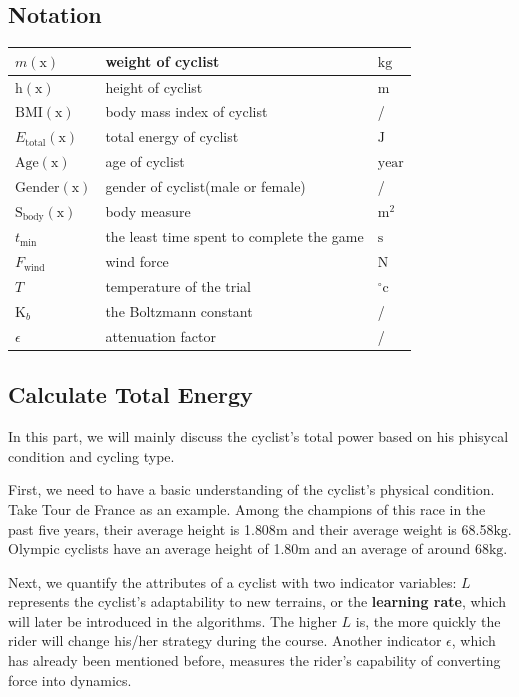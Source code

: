 \documentclass[12pt]{article}
\theoremstyle{definition}
\theoremstyle{remark}
\numberwithin{equation}{section}
\begin{document}
	\subsection{Notation}
	\begin{tabular}{|l|l|l|}
		\hline
		$m(\mathrm{x})$&weight of cyclist&$\mathrm{kg}$\\
		\hline
		$\mathrm{h}(\mathrm{x})$&height of cyclist&$\mathrm{m}$\\
		\hline
		$\mathrm{BMI}(\mathrm{x})$&body mass index of cyclist&/\\
		\hline
		$E_\mathrm{total} (\mathrm{x})$&total energy of cyclist&$\mathrm{J}$\\
		\hline
		$\mathrm{Age}(\mathrm{x})$&age of cyclist&$\mathrm{year}$\\
		\hline
		$\mathrm{Gender}(\mathrm{x})$&gender of cyclist(male or female)&/\\
		\hline
		$\mathrm{S}_\mathrm{body}(\mathrm{x})$&body measure&$\mathrm{m}^2$\\
		\hline
		$t_\mathrm{min}$&the least time spent to complete the game&$\mathrm{s}$\\
		\hline
		$F_\mathrm{wind}$&wind force&$\mathrm{N}$\\
		\hline
		$T$&temperature of the trial&$^{\circ}\mathrm{c}$\\
		\hline
		$\mathrm{K}_b$&the Boltzmann constant&/\\
		\hline
		$\epsilon$&attenuation factor&/\\
		\hline
	\end{tabular}
	\subsection{Calculate Total Energy}
	In this part, we will mainly discuss the cyclist's total power based on his phisycal condition and cycling type. 

	First, we need to have a basic understanding of the cyclist's physical condition. Take Tour de France as an example\cite{france}. Among the champions of this race in the past five years, their average height is 1.808$\mathrm{m}$ and their average weight is 68.58$\mathrm{kg}$. Olympic cyclists have an average height of 1.80$\mathrm{m}$ and an average of around 68$\mathrm{kg}$\cite{weight}. 

	Next, we quantify the attributes of a cyclist with two indicator variables: \(L\) represents the cyclist's adaptability to new terrains, or the \textbf{learning rate}, which will later be introduced in the algorithms. The higher \(L\) is, the more quickly the rider will change his/her strategy during the course. Another indicator \(\epsilon\), which has already been mentioned before, measures the rider's capability of converting force into dynamics.
\end{document}
